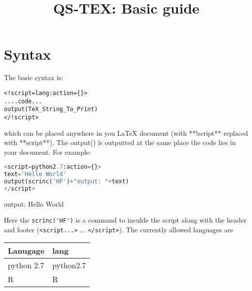 \documentclass[a4paper,12pt,twocolum]{article}
\title{QS-TEX: Basic guide}
\begin{document}
\maketitle
\section{Syntax}
The basic syntax is:
\begin{lstlisting}
<!script=lang:action={}>
....code...
output(TeX_String_To_Print)
</!script>
\end{lstlisting}
which can be placed anywhere in you LaTeX document (with **!script** replaced with **script**). The output() is outputted at the same place the code lies in your document.  For example:


\begin{lstlisting}[language=python,style=mystyle0]
<script=python2.7:action={}>
text='Hello World'
output(scrinc('HF')+"output: "+text)
</script>\end{lstlisting}
          output: Hello World

Here the \lstinline{scrinc('HF')} is a command to inculde the script along with the header and footer (\lstinline{<script...>} ... \lstinline{</script>}). The currently allowed languages are
\\
\begin{center}
\begin{tabular}{|p{1in}|p{1in}|}
\hline
Lanugage & lang \\ \hline
python 2.7 & python2.7\\ \hline
R&R\\ \hline
\end{tabular}
\end{center}
\end{document}
